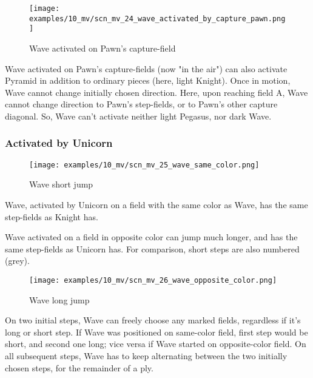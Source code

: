 \clearpage %

\vspace*{-2.1\baselineskip}
\noindent
\begin{figure}[!h]
\texttt{[image: examples/10\_mv/scn\_mv\_24\_wave\_activated\_by\_capture\_pawn.png]}
\caption{Wave activated on Pawn's capture-field}
\label{fig:scn_mv_24_wave_activated_by_capture_pawn}
\end{figure}

Wave activated on Pawn's capture-fields (now "in the air") can also activate Pyramid
in addition to ordinary pieces (here, light Knight). Once in motion, Wave cannot
change initially chosen direction. Here, upon reaching field A, Wave cannot change
direction to Pawn's step-fields, or to Pawn's other capture diagonal. So, Wave can't
activate neither light Pegasus, nor dark Wave.

\clearpage %

\subsubsection*{Activated by Unicorn}
\label{sec:Miranda's veil/Wave/Movement/Activated by Unicorn}

\vspace*{-0.7\baselineskip}
\noindent
\begin{wrapfigure}[10]{l}{0.45\textwidth}
\centering
\texttt{[image: examples/10\_mv/scn\_mv\_25\_wave\_same\_color.png]}
\vspace*{-0.3\baselineskip}
\caption{Wave short jump}
\label{fig:scn_mv_25_wave_same_color}
\end{wrapfigure}
Wave, activated by Unicorn on a field with the same color as Wave, has the same step-fields
as Knight has.

Wave activated on a field in opposite color can jump much longer, and has the same step-fields
as Unicorn has. For comparison, short steps are also numbered (grey).

\vspace*{0.7\baselineskip}
\noindent
\begin{wrapfigure}[18]{l}{0.7\textwidth}
\centering
\texttt{[image: examples/10\_mv/scn\_mv\_26\_wave\_opposite\_color.png]}
\vspace*{-0.3\baselineskip}
\caption{Wave long jump}
\label{fig:scn_mv_26_wave_opposite_color}
\end{wrapfigure}
On two initial steps, Wave can freely choose any marked fields, regardless if it's long or short step.
If Wave was positioned on same-color field, first step would be short, and second one long; vice versa
if Wave started on opposite-color field. On all subsequent steps, Wave has to keep alternating between
the two initially chosen steps, for the remainder of a ply.

